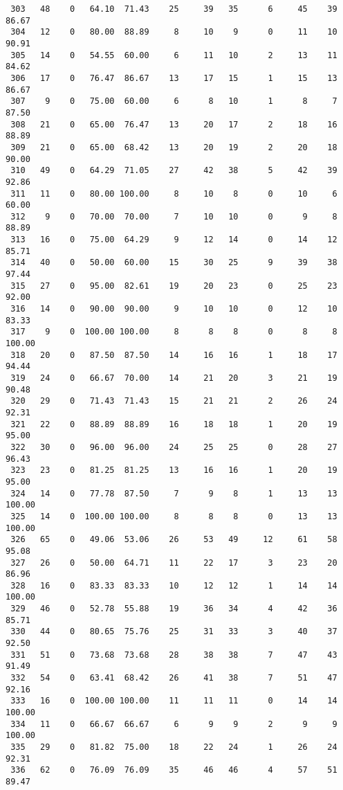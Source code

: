 \begin{verbatim}
 303   48    0   64.10  71.43    25     39   35      6     45    39    86.67
 304   12    0   80.00  88.89     8     10    9      0     11    10    90.91
 305   14    0   54.55  60.00     6     11   10      2     13    11    84.62
 306   17    0   76.47  86.67    13     17   15      1     15    13    86.67
 307    9    0   75.00  60.00     6      8   10      1      8     7    87.50
 308   21    0   65.00  76.47    13     20   17      2     18    16    88.89
 309   21    0   65.00  68.42    13     20   19      2     20    18    90.00
 310   49    0   64.29  71.05    27     42   38      5     42    39    92.86
 311   11    0   80.00 100.00     8     10    8      0     10     6    60.00
 312    9    0   70.00  70.00     7     10   10      0      9     8    88.89
 313   16    0   75.00  64.29     9     12   14      0     14    12    85.71
 314   40    0   50.00  60.00    15     30   25      9     39    38    97.44
 315   27    0   95.00  82.61    19     20   23      0     25    23    92.00
 316   14    0   90.00  90.00     9     10   10      0     12    10    83.33
 317    9    0  100.00 100.00     8      8    8      0      8     8   100.00
 318   20    0   87.50  87.50    14     16   16      1     18    17    94.44
 319   24    0   66.67  70.00    14     21   20      3     21    19    90.48
 320   29    0   71.43  71.43    15     21   21      2     26    24    92.31
 321   22    0   88.89  88.89    16     18   18      1     20    19    95.00
 322   30    0   96.00  96.00    24     25   25      0     28    27    96.43
 323   23    0   81.25  81.25    13     16   16      1     20    19    95.00
 324   14    0   77.78  87.50     7      9    8      1     13    13   100.00
 325   14    0  100.00 100.00     8      8    8      0     13    13   100.00
 326   65    0   49.06  53.06    26     53   49     12     61    58    95.08
 327   26    0   50.00  64.71    11     22   17      3     23    20    86.96
 328   16    0   83.33  83.33    10     12   12      1     14    14   100.00
 329   46    0   52.78  55.88    19     36   34      4     42    36    85.71
 330   44    0   80.65  75.76    25     31   33      3     40    37    92.50
 331   51    0   73.68  73.68    28     38   38      7     47    43    91.49
 332   54    0   63.41  68.42    26     41   38      7     51    47    92.16
 333   16    0  100.00 100.00    11     11   11      0     14    14   100.00
 334   11    0   66.67  66.67     6      9    9      2      9     9   100.00
 335   29    0   81.82  75.00    18     22   24      1     26    24    92.31
 336   62    0   76.09  76.09    35     46   46      4     57    51    89.47

\end{verbatim}
